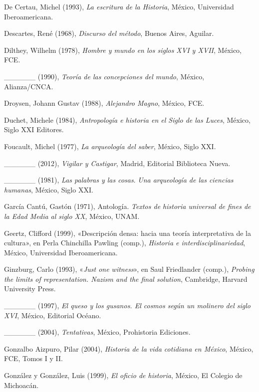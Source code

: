 \enlargethispage{1\baselineskip}
De Certau, Michel (1993), \textit{La escritura de la Historia}, México,
Universidad Iberoamericana. 


Descartes, René (1968), \textit{Discurso del método}, Buenos Aires, Aguilar.

Dilthey, Wilhelm (1978), \textit{Hombre y mundo en los siglos XVI y XVII},
México, FCE. 

\_\_\_\_\_\_ (1990), \textit{Teoría de las concepciones del mundo}, México,
Alianza\slash{}CNCA\@. 

Droysen, Johann Gustav (1988), \textit{Alejandro Magno}, México, FCE\@. 

Duchet, Michele (1984), \textit{Antropología e historia en el Siglo de las
Luces}, México, Siglo XXI Editores. 

Foucault, Michel (1977), \textit{La arqueología del saber}, México, Siglo XXI\@.

 
\_\_\_\_\_\_ (2012), \textit{Vigilar y Castigar}, Madrid, Editorial Biblioteca Nueva\@. 


\_\_\_\_\_\_ (1981), \textit{Las palabras y las cosas}. \textit{Una
arqueología de las ciencias humanas}, México, Siglo XXI\@. 


García Cantú, Gastón (1971), Antología. \textit{Textos de historia universal de
fines de la Edad Media al siglo XX}, México, UNAM\@. 


Geertz, Clifford (1999), «Descripción densa: hacia una teoría interpretativa de
la cultura», en Perla Chinchilla Pawling
(comp.), {\itshape Historia e interdisciplinariedad}, México, Universidad Iberoamericana.

\begin{sloppypar}
Ginzburg, Carlo (1993), «\textit{Just one witness}», en Saul Friedlander
(comp.), {\itshape Probing the limits of representation. Nazism and the final solution},
Cambridge, Harvard University Press. 
\end{sloppypar}

 
\_\_\_\_\_\_ (1997), \textit{El queso y los gusanos. El cosmos según un
molinero del siglo XVI}, México, Editorial Océano. 

\_\_\_\_\_\_ (2004), \textit{Tentativas}, México, Prohistoria Ediciones. 

Gonzalbo Aizpuro, Pilar (2004), \textit{Historia de la vida cotidiana en
México}, México, FCE, Tomos I y II\@. 


González y González, Luis (1999), \textit{El oficio de historia}, México, El Colegio de
Michoacán. 


